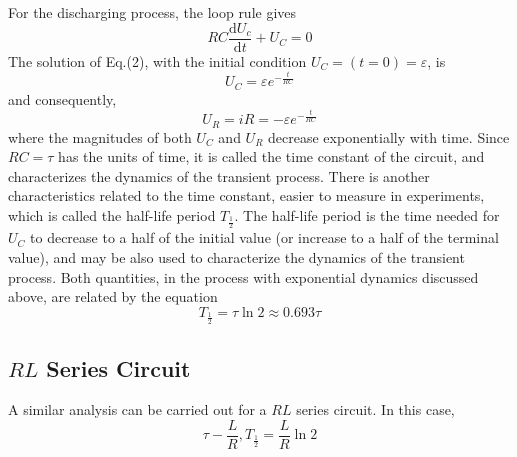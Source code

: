 \documentclass[12pt]{article}
\begin{document}
\par For the discharging process, the loop rule gives
\begin{equation}
RC\frac{\mathrm{d}U_c}{\mathrm{d}t}+U_C=0
\end{equation}
The solution of Eq.(2), with the initial condition $U_C=(t=0)=\varepsilon$, is 
$$U_C=\varepsilon e^{-\frac{t}{RC}}$$
and consequently,
$$U_R=iR=-\varepsilon e^{-\frac{t}{RC}}$$
where the magnitudes of both $U_C$ and $U_R$ decrease exponentially with time. Since $RC=\tau$ has the units of time, it is called the time constant of the circuit, and characterizes the dynamics of the transient process. There is another characteristics related to the time constant, easier to measure in experiments, which is called the half-life period $T_\frac{1}{2}$. The half-life period is the time needed for $U_C$ to decrease to a half of the initial value (or
increase to a half of the terminal value), and may be also used to characterize the dynamics of the transient process. Both quantities, in the process with exponential dynamics discussed above, are related by the equation
$$T_{\frac{1}{2}}=\tau\ln2\approx0.693\tau$$
\subsection{$RL$ Series Circuit}
A similar analysis can be carried out for a $RL$ series circuit. In this case,
$$\tau-\frac{L}{R},T_{\frac{1}{2}}=\frac{L}{R}\ln2$$
\end{document}
